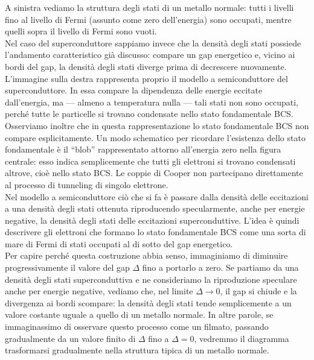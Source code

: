 \hspace{-0.6cm}A sinistra vediamo la struttura degli stati di un metallo normale: tutti i livelli fino al livello di Fermi (assunto come zero dell'energia) sono occupati, mentre quelli sopra il livello di Fermi sono vuoti.\\
Nel caso del superconduttore sappiamo invece che la densità degli stati possiede l'andamento caratteristico già discusso: compare un gap energetico e, vicino ai bordi del gap, la densità degli stati diverge prima di decrescere nuovamente.\\
L'immagine sulla destra rappresenta proprio il modello a semiconduttore del superconduttore. In essa compare la dipendenza delle energie eccitate dall'energia, ma — almeno a temperatura nulla — tali stati non sono occupati, perché tutte le particelle si trovano condensate nello stato fondamentale BCS.\\
Osserviamo inoltre che in questa rappresentazione lo stato fondamentale BCS non compare esplicitamente.
Un modo schematico per ricordare l'esistenza dello stato fondamentale è il ``blob'' rappresentato attorno all'energia zero nella figura centrale: esso indica semplicemente che tutti gli elettroni si trovano condensati altrove, cioè nello stato BCS. Le coppie di Cooper non partecipano direttamente al processo di tunneling di singolo elettrone.\\
Nel modello a semiconduttore ciò che si fa è passare dalla densità delle eccitazioni a una densità degli stati ottenuta riproducendo specularmente, anche per energie negative, la densità degli stati delle eccitazioni superconduttive. L'idea è quindi descrivere gli elettroni che formano lo stato fondamentale BCS come una sorta di mare di Fermi di stati occupati al di sotto del gap energetico.\\
Per capire perché questa costruzione abbia senso, immaginiamo di diminuire progressivamente il valore del gap $\Delta$ fino a portarlo a zero. Se partiamo da una densità degli stati superconduttiva e ne consideriamo la riproduzione speculare anche per energie negative, vediamo che, nel limite $\Delta \to 0$, il gap si chiude e la divergenza ai bordi scompare: la densità degli stati tende semplicemente a un valore costante uguale a quello di un metallo normale. In altre parole, se immaginassimo di osservare questo processo come un filmato, passando gradualmente da un valore finito di $\Delta$ fino a $\Delta=0$, vedremmo il diagramma trasformarsi gradualmente nella struttura tipica di un metallo normale.\\

